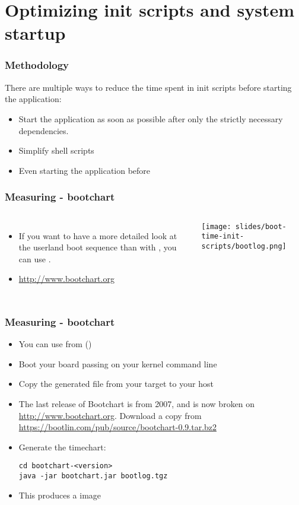 \section{Optimizing init scripts and system startup}
\begin{frame}
\frametitle{Methodology}
There are multiple ways to reduce the time spent in init scripts before
starting the application:
\begin{itemize}
	\item Start the application as soon as possible after only the
              strictly necessary dependencies.
	\item Simplify shell scripts
	\item Even starting the application before 
\end{itemize}
\end{frame}

\begin{frame}
\frametitle{Measuring - bootchart}
\begin{columns}
\begin{itemize}
	\item If you want to have a more detailed look at the userland boot sequence
              than with , you can use .
	\item \url{http://www.bootchart.org}
\end{itemize}
\texttt{[image: slides/boot-time-init-scripts/bootlog.png]}
\end{columns}
\end{frame}

\begin{frame}[fragile]
\frametitle{Measuring - bootchart}
\begin{itemize}
	\item You can use  from 
	      ()
	\item Boot your board passing  on your
	      kernel command line
	\item Copy the generated  file from your target to your host
	\item The last release of Bootchart is from 2007, and is now
	      broken on \url{http://www.bootchart.org}. Download a copy
	      from \url{https://bootlin.com/pub/source/bootchart-0.9.tar.bz2}
	\item Generate the timechart:
\begin{block}{}
\begin{verbatim}
cd bootchart-<version>
java -jar bootchart.jar bootlog.tgz
\end{verbatim}
\end{block}
	\item This produces a  image
\end{itemize}
\end{frame}

